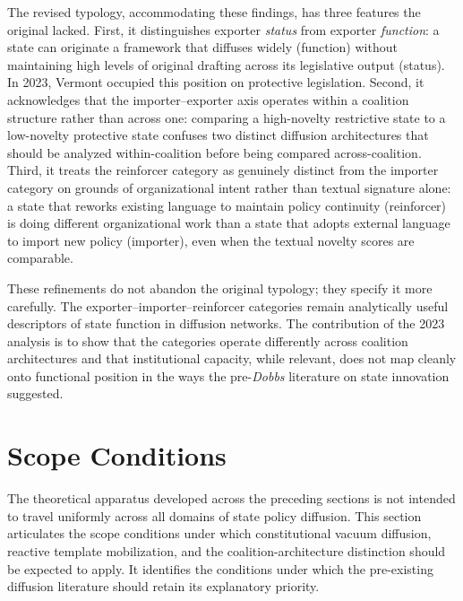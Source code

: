 The revised typology, accommodating these findings, has three features the original lacked. First, it distinguishes exporter \emph{status} from exporter \emph{function}: a state can originate a framework that diffuses widely (function) without maintaining high levels of original drafting across its legislative output (status). In 2023, Vermont occupied this position on protective legislation. Second, it acknowledges that the importer--exporter axis operates within a coalition structure rather than across one: comparing a high-novelty restrictive state to a low-novelty protective state confuses two distinct diffusion architectures that should be analyzed within-coalition before being compared across-coalition. Third, it treats the reinforcer category as genuinely distinct from the importer category on grounds of organizational intent rather than textual signature alone: a state that reworks existing language to maintain policy continuity (reinforcer) is doing different organizational work than a state that adopts external language to import new policy (importer), even when the textual novelty scores are comparable.
 
These refinements do not abandon the original typology; they specify it more carefully. The exporter--importer--reinforcer categories remain analytically useful descriptors of state function in diffusion networks. The contribution of the 2023 analysis is to show that the categories operate differently across coalition architectures and that institutional capacity, while relevant, does not map cleanly onto functional position in the ways the pre-\textit{Dobbs} literature on state innovation suggested.
 
\section{Scope Conditions}
\label{sec:scope-conditions}
 
The theoretical apparatus developed across the preceding sections is not intended to travel uniformly across all domains of state policy diffusion. This section articulates the scope conditions under which constitutional vacuum diffusion, reactive template mobilization, and the coalition-architecture distinction should be expected to apply. It identifies the conditions under which the pre-existing diffusion literature should retain its explanatory priority.
 
